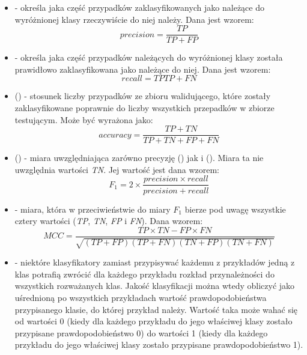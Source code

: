 	\begin{itemize}
		\item {} - określa jaka część przypadków zaklasyfikowanych jako należące do wyróżnionej klasy rzeczywiście do niej należy. Dana jest wzorem:
		 $$ precision = \frac{TP}{TP+FP} $$
		
		\item {} - określa jaka część przypadków należących do wyróżnionej klasy została prawidłowo zaklasyfikowana jako należące do niej. Dana jest wzorem:
		$$ recall = {TP}{TP+FN} $$

		\item {} () - stosunek liczby przypadków ze zbioru walidującego, które zostały zaklasyfikowane poprawnie do liczby wszystkich przepadków w zbiorze testującym. Może być wyrażona jako:
		$$ accuracy = \frac{TP+TN}{TP+TN+FP+FN} $$

		\item {} () - 	miara uwzględniająca zarówno precyzję () jak i  (). Miara ta nie uwzględnia wartości \emph{TN}. Jej wartość jest dana wzorem:
		$$ F_{1} = 2 \times \frac{precision \times recall}{precision + recall} $$
		 
		
		\item {} - miara, która w przeciwieństwie do miary $ F_{1} $ bierze pod uwagę wszystkie cztery wartości (\emph{TP}, \emph{TN}, \emph{FP} i \emph{FN}). Dana wzorem: 
		$$ MCC = \frac{ TP \times TN - FP \times FN } {\sqrt{ (TP + FP) ( TP + FN ) ( TN + FP ) ( TN + FN ) } } $$
		
		\item {} - niektóre klasyfikatory zamiast przypisywać każdemu z przykładów jedną z klas potrafią zwrócić dla każdego przykładu rozkład przynależności do wszystkich rozważanych klas. Jakość klasyfikacji można wtedy obliczyć jako uśrednioną po wszystkich przykładach wartość prawdopodobieństwa przypisanego klasie, do której przykład należy. Wartość taka może wahać się od wartości 0 (kiedy dla każdego przykładu do jego właściwej klasy zostało przypisane prawdopodobieństwo 0) do wartości 1 (kiedy dla każdego przykładu do jego właściwej klasy zostało przypisane prawdopodobieństwo 1).

	\end{itemize}		

